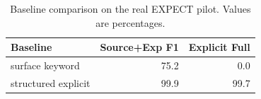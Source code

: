 \begin{table}[t]
\centering
\small
\begin{tabular}{lrr}
\toprule
Baseline & Source+Exp F1 & Explicit Full \\
\midrule
surface keyword & 75.2 & 0.0 \\
structured explicit & 99.9 & 99.7 \\
\bottomrule
\end{tabular}
\caption{Baseline comparison on the real EXPECT pilot. Values are percentages.}
\label{tab:baseline-comparison}
\end{table}
